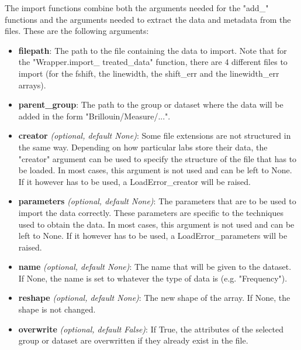 The import functions combine both the arguments needed for the "add\_" functions and the arguments needed to extract the data and metadata from the files. These are the following arguments:
    \begin{itemize}
        \item \textbf{filepath}: The path to the file containing the data to import. Note that for the "Wrapper.import\_ treated\_data" function, there are 4 different files to import (for the fshift, the linewidth, the shift\_err and the linewidth\_err arrays).
        \item \textbf{parent\_group}: The path to the group or dataset where the data will be added in the form "Brillouin/Measure/...".
        \item \textbf{creator} \textit{(optional, default None)}: Some file extensions are not structured in the same way. Depending on how particular labs store their data, the "creator" argument can be used to specify the structure of the file that has to be loaded. In most cases, this argument is not used and can be left to None. If it however has to be used, a LoadError\_creator will be raised.
        \item \textbf{parameters} \textit{(optional, default None)}: The parameters that are to be used to import the data correctly. These parameters are specific to the techniques used to obtain the data. In most cases, this argument is not used and can be left to None. If it however has to be used, a LoadError\_parameters will be raised.
        \item \textbf{name} \textit{(optional, default None)}: The name that will be given to the dataset. If None, the name is set to whatever the type of data is (e.g. "Frequency").
        \item \textbf{reshape} \textit{(optional, default None)}: The new shape of the array. If None, the shape is not changed.    
        \item \textbf{overwrite} \textit{(optional, default False)}: If True, the attributes of the selected group or dataset are overwritten if they already exist in the file.
    \end{itemize}
